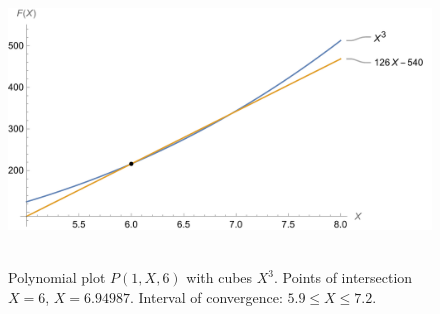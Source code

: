 ﻿\begin{figure}[H]
    \centering
    \includegraphics[width=1\textwidth]{sections/images/01_plots_polynomial_p1_n6_with_cubes}
    ~\caption{Polynomial plot $P(1, X, 6)$ with cubes $X^3$.
    Points of intersection $X=6$, $X=6.94987$.
    Interval of convergence: $5.9 \leq X \leq 7.2$.
    }\label{fig:figure7}
\end{figure}

